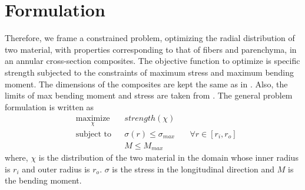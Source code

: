 \documentclass[openright,twoside]{iitkthesis}
\begin{document}
\section{Formulation}
Therefore, we frame a constrained problem, optimizing the radial distribution of two material, with properties corresponding to that of fibers and parenchyma, in an annular cross-section composites. The objective function to optimize is specific strength subjected to the constraints of maximum stress and maximum bending moment. The dimensions of the composites are kept the same as in \cite{mannan2018stiffness}. Also, the limits of max bending moment and stress are taken from \cite{mannan2018stiffness}. The general problem formulation is written as
\begin{equation*}
\begin{aligned}
& \underset{\chi}{\text{maximize}}
& & strength(\chi) \\
& \text{subject to}
& & \sigma(r) \leq \sigma_{max} &\quad \forall r \in [r_i, r_o]\\
& & & M \leq M_{max}
\end{aligned}
\end{equation*}
where, $\chi$ is the distribution of the two material in the domain whose inner radius is $r_i$ and outer radius is $r_o$.  $\sigma$ is the stress in the longitudinal direction and $M$ is the bending moment. \\
\end{document}
